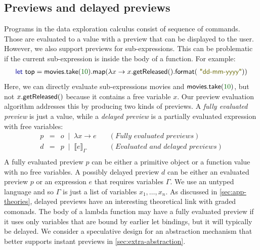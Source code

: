 \documentclass[english,crc,references=cleveref]{programming}
\theoremstyle{plain}
\theoremstyle{definition}
\newcommand{\lsep}{\;\;|\;\;}
\newcommand{\Num}[1]{\num[color=numclr]{#1}}
\newcommand{\str}[1]{\textnormal{\textcolor{strclr}{\sffamily "#1"}}}
\newcommand{\ident}[1]{\textnormal{\textcolor{idclr}{\sffamily #1}}}
\newcommand{\kvd}[1]{\textnormal{\textcolor{kvdclr}{\sffamily #1}}}
\begin{document}

\subsection{Previews and delayed previews}

Programs in the data exploration calculus consist of sequence of commands. Those are
evaluated to a value with a preview that can be displayed to the user. However, we also support
previews for sub-expressions. This can be problematic if the current sub-expression is inside
the body of a function. For example:
%
\begin{equation*}
\begin{array}{l}
\kvd{let}~\ident{top} = \ident{movies}.\ident{take}(\Num{10}).\ident{map}(\lambda x \rightarrow x.\ident{getReleased}().\ident{format}(\str{dd-mm-yyyy}))
\end{array}
\end{equation*}
%
Here, we can directly evaluate sub-expressions \ident{movies} and $\ident{movies}.\ident{take}(\Num{10})$,
but not $x.\ident{getReleased}()$ because it contains a free variable $x$. Our preview evaluation algorithm addresses this by
producing two kinds of previews. A \emph{fully evaluated preview} is just a value, while
a \emph{delayed preview} is a partially evaluated expression with free variables:
%
\begin{equation*}
\begin{array}{rcll}
p&=&o \lsep  \lambda x\rightarrow e&\quad(\textit{Fully evaluated previews})\\
d&=&p \lsep  \llbracket e \rrbracket_\Gamma&\quad(\textit{Evaluated and delayed previews})\\
\end{array}
\end{equation*}
%
A fully evaluated preview $p$ can be either a primitive object or a function value with no free
variables. A possibly delayed preview $d$ can be either an evaluated preview $p$ or an expression
$e$ that requires variables $\Gamma$. We use an untyped language and so $\Gamma$ is just a list of
variables $x_1, \ldots, x_n$. As discussed in \cref{sec:app-theories},
delayed previews have an interesting theoretical link with graded comonads.
The body of a lambda function may have a fully evaluated preview if it uses only variables that
are bound by earlier let bindings, but it will typically be delayed. We consider a speculative
design for an abstraction mechanism that better supports instant previews in
\cref{sec:extra-abstraction}.
\end{document}
